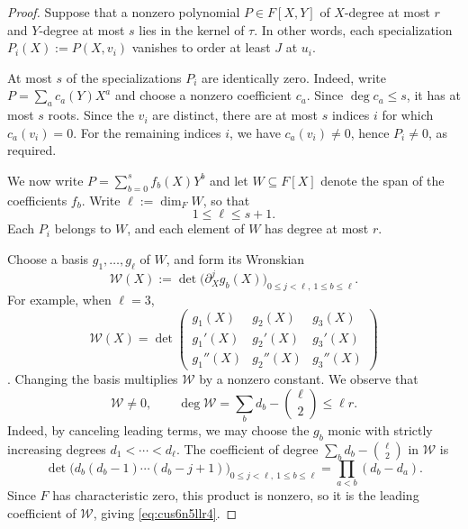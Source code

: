 \documentclass[reqno]{amsart} 
\begin{document}
\begin{proof}
  Suppose that a nonzero polynomial $P \in F[X,Y]$ of $X$-degree at most $r$ and $Y$-degree at most $s$ lies in the kernel of $\tau$.  In other words, each specialization $P_i(X):=P(X,v_i)$ vanishes to order at least $J$ at $u_i$.

  At most $s$ of the specializations $P_i$ are identically zero.  Indeed, write $P=\sum_a c_a(Y)X^a$ and choose a nonzero coefficient $c_a$.  Since $\deg c_a\leq s$, it has at most $s$ roots.  Since the $v_i$ are distinct, there are at most $s$ indices $i$ for which $c_a(v_i)=0$.  For the remaining indices $i$, we have $c_a(v_i) \neq 0$, hence $P_i \neq 0$, as required.

  We now write $P=\sum_{b=0}^s f_b(X)Y^b$ and let $W\subseteq F[X]$ denote the span of the coefficients $f_b$.  Write $\ell:=\dim_F W$, so that
  \begin{equation}\label{eq:cus6n50s8z}
    1\leq\ell\leq s+1.
  \end{equation}
  Each $P_i$ belongs to $W$, and each element of $W$ has degree at most $r$.

  Choose a basis $g_1,\dotsc,g_\ell$ of $W$, and form its Wronskian
  \begin{equation*}
    \mathcal W(X):=\det\bigl(\partial_X^j g_b(X)\bigr)_{0\leq j<\ell,\ 1\leq b\leq\ell}.
  \end{equation*}
  For example, when $\ell = 3$,
  \begin{equation*}
    \mathcal{W}(X) = \det\begin{pmatrix}
      g_1(X) & g_2(X) & g_3(X) \\
      g_1'(X) & g_2'(X) & g_3'(X) \\
      g_1''(X) & g_2''(X) & g_3''(X)
    \end{pmatrix}
  \end{equation*}.
  Changing the basis multiplies $\mathcal W$ by a nonzero constant.  We observe that
  \begin{equation}\label{eq:cus6n5llr4}
    \mathcal W\neq0,\qquad
    \deg\mathcal W=\sum_b d_b-\binom\ell2\leq\ell r.
  \end{equation}
  Indeed, by canceling leading terms, we may choose the $g_b$ monic with strictly increasing degrees $d_1<\dotsb<d_\ell$.  The coefficient of degree $\sum_b d_b-\binom\ell2$ in $\mathcal W$ is
  \begin{equation*}
    \det\bigl(d_b(d_b-1)\dotsb(d_b-j+1)\bigr)_{0\leq j<\ell,\ 1\leq b\leq\ell}
    =\prod_{a<b}(d_b-d_a).
  \end{equation*}
  Since $F$ has characteristic zero, this product is nonzero, so it is the leading coefficient of $\mathcal W$, giving \eqref{eq:cus6n5llr4}.


\end{proof}
\end{document}

